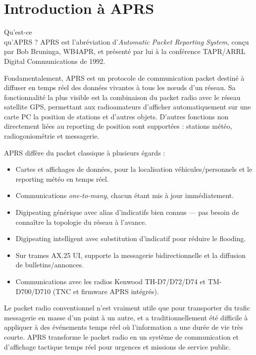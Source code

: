 \chapter[INTRODUCTION À APRS]{Introduction à APRS}\label{introduction-uxe0-aprs}

\begin{aprssideblock}{Qu'est-ce\\qu'APRS ?}
APRS est l'abréviation d'\emph{Automatic Packet Reporting System},
conçu par Bob Bruninga, WB4APR, et présenté par lui à la conférence
TAPR/ARRL Digital Communications de 1992.

Fondamentalement, APRS est un protocole de communication packet destiné
à diffuser en temps réel des données vivantes à tous les nœuds d'un
réseau. Sa fonctionnalité la plus visible est la combinaison du packet
radio avec le réseau satellite GPS, permettant aux radioamateurs
d'afficher automatiquement sur une carte PC la position de stations et
d'autres objets. D'autres fonctions non directement liées au reporting
de position sont supportées : stations météo, radiogoniométrie et
messagerie.

APRS diffère du packet classique à plusieurs égards :

\begin{itemize}
\tightlist
\item
  Cartes et affichages de données, pour la localisation
  véhicules/personnels et le reporting météo en temps réel.
\item
  Communications \emph{one-to-many}, chacun étant mis à jour
  immédiatement.
\item
  Digipeating générique avec alias d'indicatifs bien connus --- pas
  besoin de connaître la topologie du réseau à l'avance.
\item
  Digipeating intelligent avec substitution d'indicatif pour réduire le
  flooding.
\item
  Sur trames AX.25 UI, supporte la messagerie bidirectionnelle et la
  diffusion de bulletins/annonces.
\item
  Communications avec les radios Kenwood TH-D7/D72/D74 et
  TM-D700/D710 (TNC et firmware APRS intégrés).
\end{itemize}

Le packet radio conventionnel n'est vraiment utile que pour transporter
du trafic messagerie en masse d'un point à un autre, et a
traditionnellement été difficile à appliquer à des événements temps réel
où l'information a une durée de vie très courte. APRS transforme le
packet radio en un système de communication et d'affichage tactique
temps réel pour urgences et missions de service public.


\end{aprssideblock}
